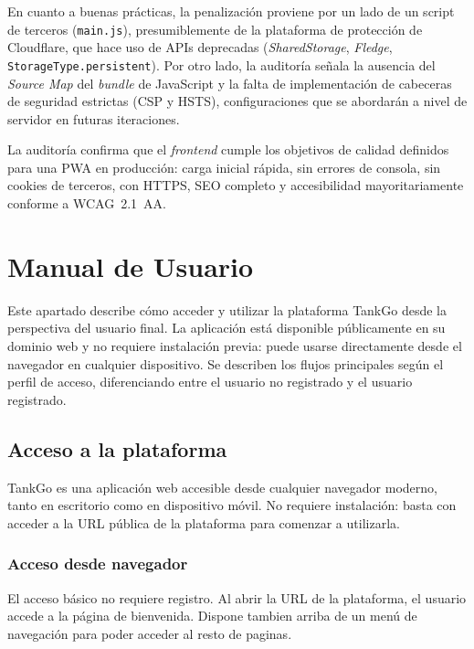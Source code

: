 En cuanto a buenas prácticas, la penalización proviene por un lado de un script de terceros
(\texttt{main.js}), presumiblemente de la plataforma de protección de Cloudflare, que hace uso de APIs deprecadas
(\textit{SharedStorage}, \textit{Fledge}, \texttt{StorageType.persistent}). Por otro lado, la auditoría señala la
ausencia del \textit{Source Map} del \textit{bundle} de JavaScript y la falta de implementación de cabeceras de seguridad
estrictas (CSP y HSTS), configuraciones que se abordarán a nivel de servidor en futuras iteraciones.

La auditoría confirma que el \textit{frontend} cumple los objetivos de calidad definidos para
una PWA en producción: carga inicial rápida, sin errores de consola, sin cookies de terceros,
con HTTPS, SEO completo y accesibilidad mayoritariamente conforme a WCAG~2.1~AA.

\section{Manual de Usuario}
\label{sec:manual_usuario}

Este apartado describe cómo acceder y utilizar la plataforma TankGo desde la perspectiva
del usuario final. La aplicación está disponible públicamente en su dominio web y no
requiere instalación previa: puede usarse directamente desde el navegador en cualquier
dispositivo. Se describen los flujos principales según el perfil de acceso, diferenciando
entre el usuario no registrado y el usuario registrado.

\subsection{Acceso a la plataforma}
\label{subsec:manual_acceso}

TankGo es una aplicación web accesible desde cualquier navegador moderno, tanto en
escritorio como en dispositivo móvil. No requiere instalación: basta con acceder a la URL
pública de la plataforma para comenzar a utilizarla.

\subsubsection*{Acceso desde navegador}

El acceso básico no requiere registro. Al abrir la URL de la plataforma, el usuario accede
a la página de bienvenida. Dispone tambien arriba de un menú de navegación para poder acceder al resto de paginas.

